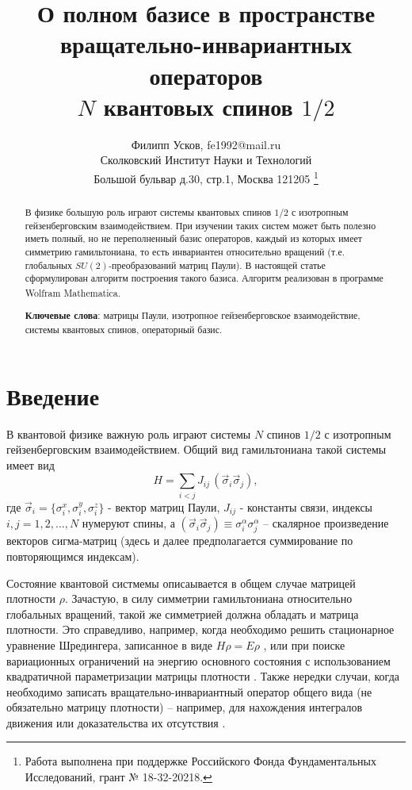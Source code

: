 \documentclass[]{article}
\title{О полном базисе  в пространстве \\ вращательно-инвариантных операторов \\ $N$ квантовых спинов $1/2$}
\author{Филипп Усков, fe1992@mail.ru\\ {\small Сколковский Институт Науки и Технологий}\\
{\small Большой бульвар д.30, стр.1,
Москва 121205}
\footnote{
Работа выполнена при поддержке Российского Фонда Фундаментальных Исследований, грант № 18-32-20218.
}
}
\renewcommand{\[}{\begin{equation}}
\renewcommand{\]}{\end{equation}}
\begin{document}
\maketitle

\begin{abstract}
В физике большую роль играют системы квантовых спинов $1/2$ с изотропным гейзенберговским взаимодействием. При изучении таких систем может быть полезно иметь полный, но не переполненный базис операторов, каждый из которых имеет симметрию гамильтониана, то есть инвариантен относительно вращений (т.е. глобальных $SU(2)$-преобразований матриц Паули).	
В настоящей статье сформулирован алгоритм построения такого базиса. Алгоритм реализован в программе Wolfram Mathematica\textsuperscript{\textcopyright}.

{\bf Ключевые слова}: матрицы Паули, изотропное гейзенберговское взаимодействие, системы квантовых спинов, операторный базис.
\end{abstract}

\section{Введение}

В квантовой физике важную роль играют системы $N$ спинов $1/2$ с изотропным гейзенберговским взаимодействием. Общий вид гамильтониана такой системы имеет вид
$$
H=\sum_{i< j}J_{ij}\,(\vec\sigma_i\vec\sigma_j),
$$
где $\vec\sigma_i = \{\sigma_i^x,\sigma_i^y,\sigma_i^z\}$ - вектор матриц Паули, $J_{ij}$ - константы связи,   индексы $i,j=1,2,...,N$ нумеруют спины, а $(\vec\sigma_i\vec\sigma_j)\equiv \sigma_i^\alpha \sigma_j^\alpha$ -- скалярное произведение векторов сигма-матриц (здесь и далее предполагается суммирование по повторяющимся индексам).

Состояние квантовой  систмемы описаывается в общем случае матрицей плотности $\rho$. Зачастую, в силу симметрии гамильтониана относительно глобальных вращений, такой же симметрией должна обладать и матрица плотности. Это справедливо, например, когда необходимо решить стационарное уравнение Шредингера, записанное в виде $ H\rho = E\rho $ \cite{USH}, или при поиске вариационных ограничений на энергию основного состояния \cite{variational} с использованием квадратичной параметризации матрицы плотности \cite{kvadro}.   Также нередки случаи, когда необходимо записать вращательно-инвариантный оператор общего вида (не обязательно матрицу плотности) -- например, для нахождения интегралов движения \cite{basisF} или доказательства их отсутствия \cite{Shiraishi}.  
\end{document}
